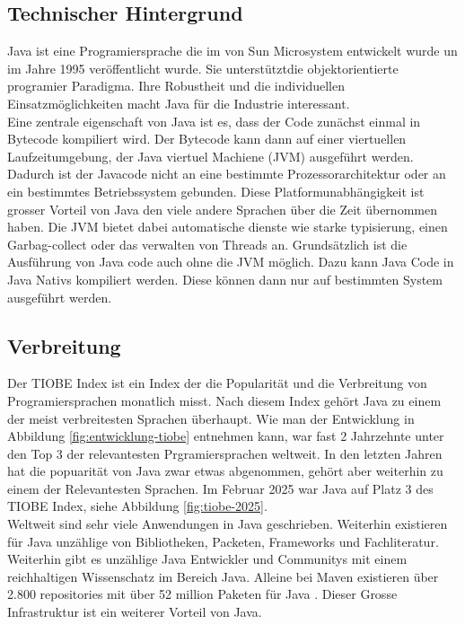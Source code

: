 \documentclass[11pt]{article}
\begin{document}
    \subsection{Technischer Hintergrund}
    Java ist eine Programiersprache die im von Sun Microsystem entwickelt wurde un im Jahre 1995
    veröffentlicht wurde. Sie unterstütztdie objektorientierte programier Paradigma. Ihre Robustheit
    und die individuellen Einsatzmöglichkeiten macht Java für die Industrie interessant.\\
    Eine zentrale eigenschaft von Java ist es, dass der Code zunächst einmal in Bytecode kompiliert wird.
    Der Bytecode kann dann auf einer viertuellen Laufzeitumgebung, der Java viertuel Machiene (JVM) ausgeführt werden.
    Dadurch ist der Javacode nicht an eine bestimmte Prozessorarchitektur oder an ein bestimmtes Betriebssystem gebunden.
    Diese Platformunabhängigkeit ist grosser Vorteil von Java den viele andere Sprachen über die Zeit übernommen haben.
    Die JVM bietet dabei automatische dienste wie starke typisierung, einen Garbag-collect oder das verwalten
    von Threads an.\cite[51 - 54]{insel}
    Grundsätzlich ist die Ausführung von Java code auch ohne die JVM möglich. Dazu kann Java Code in Java Nativs kompiliert werden.
    Diese können dann nur auf bestimmten System ausgeführt werden.


    \subsection{Verbreitung}
    Der TIOBE Index ist ein Index der die Popularität und die Verbreitung von Programiersprachen monatlich misst\cite{tiobe}.
    Nach diesem Index gehört Java zu einem der meist verbreitesten Sprachen überhaupt. Wie man der Entwicklung in Abbildung \ref{fig:entwicklung-tiobe}
    entnehmen kann, war fast 2 Jahrzehnte unter den Top 3 der relevantesten Prgramiersprachen weltweit. In den letzten Jahren hat die
    popuarität von Java zwar etwas abgenommen, gehört aber weiterhin zu einem der Relevantesten Sprachen. Im Februar 2025 war Java auf
    Platz 3 des TIOBE Index, siehe Abbildung \ref{fig:tiobe-2025}.\\
    Weltweit sind sehr viele Anwendungen in Java geschrieben. Weiterhin existieren für Java unzählige von Bibliotheken, Packeten, Frameworks und Fachliteratur.
    Weiterhin gibt es unzählige Java Entwickler und Communitys mit einem reichhaltigen Wissenschatz im Bereich Java.
    Alleine bei Maven existieren über 2.800 repositories mit über 52 million Paketen für Java \cite{maven}.
    Dieser Grosse Infrastruktur ist ein weiterer Vorteil von Java.
\end{document}
